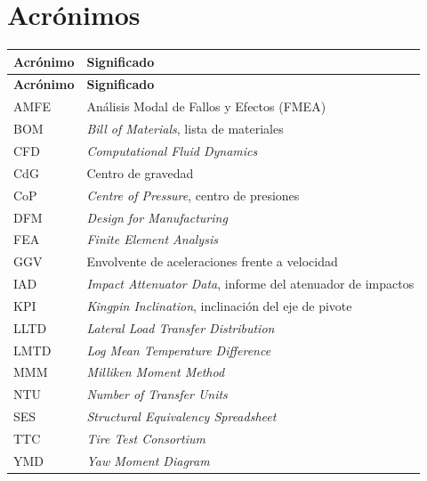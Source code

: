 \section*{Acrónimos}

\begin{longtable}{@{}p{2.6cm}p{10.5cm}@{}}
\toprule
\textbf{Acrónimo} & \textbf{Significado} \\
\midrule
\endfirsthead
\toprule
\textbf{Acrónimo} & \textbf{Significado} \\
\midrule
\endhead
AMFE   & Análisis Modal de Fallos y Efectos (FMEA) \\
BOM    & \textit{Bill of Materials}, lista de materiales \\
CFD    & \textit{Computational Fluid Dynamics} \\
CdG    & Centro de gravedad \\
CoP    & \textit{Centre of Pressure}, centro de presiones \\
DFM    & \textit{Design for Manufacturing} \\
FEA    & \textit{Finite Element Analysis} \\
GGV    & Envolvente de aceleraciones frente a velocidad \\
IAD    & \textit{Impact Attenuator Data}, informe del atenuador de impactos \\
KPI    & \textit{Kingpin Inclination}, inclinación del eje de pivote \\
LLTD   & \textit{Lateral Load Transfer Distribution} \\
LMTD   & \textit{Log Mean Temperature Difference} \\
MMM    & \textit{Milliken Moment Method} \\
NTU    & \textit{Number of Transfer Units} \\
SES    & \textit{Structural Equivalency Spreadsheet} \\
TTC    & \textit{Tire Test Consortium} \\
YMD    & \textit{Yaw Moment Diagram} \\
\bottomrule
\end{longtable}
